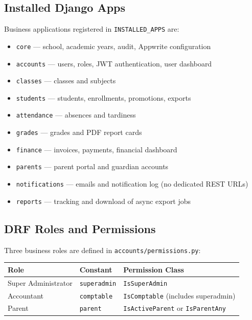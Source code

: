 \documentclass[11pt,a4paper]{article}
\begin{document}
\subsection{Installed Django Apps}

Business applications registered in \texttt{INSTALLED\_APPS} are:

\begin{itemize}[noitemsep]
    \item \texttt{core} --- school, academic years, audit, Appwrite configuration
    \item \texttt{accounts} --- users, roles, JWT authentication, user dashboard
    \item \texttt{classes} --- classes and subjects
    \item \texttt{students} --- students, enrollments, promotions, exports
    \item \texttt{attendance} --- absences and tardiness
    \item \texttt{grades} --- grades and PDF report cards
    \item \texttt{finance} --- invoices, payments, financial dashboard
    \item \texttt{parents} --- parent portal and guardian accounts
    \item \texttt{notifications} --- emails and notification log (no dedicated REST URLs)
    \item \texttt{reports} --- tracking and download of async export jobs
\end{itemize}

\subsection{DRF Roles and Permissions}

Three business roles are defined in \texttt{accounts/permissions.py}:

\begin{table}[h]
\centering
\begin{tabular}{lll}
\toprule
\textbf{Role} & \textbf{Constant} & \textbf{Permission Class} \\
\midrule
Super Administrator & \texttt{superadmin} & \texttt{IsSuperAdmin} \\
Accountant & \texttt{comptable} & \texttt{IsComptable} (includes superadmin) \\
Parent & \texttt{parent} & \texttt{IsActiveParent} or \texttt{IsParentAny} \\
\bottomrule
\end{tabular}
\end{table}
\end{document}
